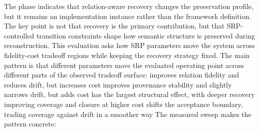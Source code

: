 {}The phase indicates that relation-aware recovery changes the preservation profile, but it remains an implementation instance rather than the framework definition. The key point is not that recovery is the primary contribution, but that SRP-controlled transition constraints shape how semantic structure is preserved during reconstruction.\markdownRendererInterblockSeparator
{}
\markdownRendererSectionEnd 
\markdownRendererSectionEnd \markdownRendererSectionBegin
{}\markdownRendererInterblockSeparator
{}This evaluation asks how SRP parameters move the system across fidelity-cost tradeoff regions while keeping the recovery strategy fixed.\markdownRendererParagraphSeparator
{}The main pattern is that different parameters move the evaluated operating point across different parts of the observed tradeoff surface:\markdownRendererInterblockSeparator
{}\markdownRendererUlBeginTight
\markdownRendererUlItem {} improves relation fidelity and reduces drift, but increases cost\markdownRendererUlItemEnd 
\markdownRendererUlItem {} improves provenance stability and slightly narrows drift, but adds cost\markdownRendererUlItemEnd 
\markdownRendererUlItem {} has the largest structural effect, with deeper recovery improving coverage and closure at higher cost\markdownRendererUlItemEnd 
\markdownRendererUlItem {} shifts the acceptance boundary, trading coverage against drift in a smoother way\markdownRendererUlItemEnd 
\markdownRendererUlEndTight \markdownRendererInterblockSeparator
{}The measured sweep makes the pattern concrete:\markdownRendererInterblockSeparator
{}\markdownRendererInterblockSeparator
